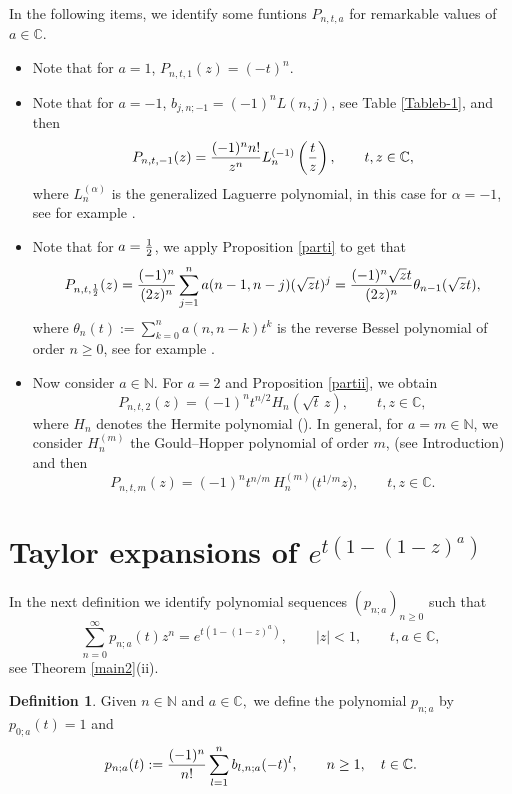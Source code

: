 \documentclass[a4paper,12pt]{amsart}
\def\N{\mathbb N}
\def\NN{\mathbb N}
\def\CC{\mathbb C}
\def\CC{\mathbb C}
\theoremstyle{definition}
\newtheorem{definition}[thm]{Definition}
\theoremstyle{remark}
\begin{document}
  In the following items, we  identify some funtions $P_{n,t,a}$ for remarkable values of $a\in \CC.$
\begin{itemize}
\item[(i)] Note that for $a=1$, $P_{n,t,1}(z)= (-t)^n$.
\item[(ii)] Note that for $a=-1$, $b_{j,n;-1}=(-1)^nL(n,j)$,  see Table \ref{Tableb-1}, and then
$$
P_{n,t,-1}(z)={(-1)^nn!\over z^n}L_n^{(-1)}\left({t\over z}\right),\qquad t,z\in \CC,
$$
where $L_n^{(\alpha)}$ is the generalized Laguerre polynomial, in this case for $\alpha=-1$, see for example \cite[Chapter V]{MOS}.

\item[(iii)]  Note that for $a={1\over 2}$, we apply Proposition \ref{parti} to get that
$$
P_{n,t,{1\over 2}}(z)={(-1)^n\over (2z)^n}\sum_{j=1}^na(n-1,n-j)(\sqrt{z}t)^j= {(-1)^n\sqrt{z}t\over (2z)^n}\theta_{n-1}(\sqrt{z}t),
$$
where  $\theta_{n}(t):=\displaystyle{\sum_{k=0}^n a(n,n-k)t^k}$ is the reverse Bessel polynomial of order $n\ge 0$, see for example \cite[p.7]{G}.


\item[(iv)]Now consider $a\in \N$. For  $a=2$ and Proposition \ref{partii},  we obtain
\begin{equation}\label{Hermite}
P_{n,t,2}(z)=(-1)^nt^{n/2}H_n(\sqrt{t}\,z),\qquad t,z\in \CC,
\end{equation}
where \(H_n\) denotes the Hermite polynomial (\cite[Chapter V]{MOS}). In general, for $a=m\in \N$, we consider \(H_n^{(m)}\)  the Gould--Hopper polynomial of order \(m\), (see Introduction) and
then
\[
P_{n,t,m}(z)
= (-1)^n t^{n/m}
\,H_n^{(m)}\!\bigl(t^{1/m}z\bigr), \qquad t,z\in \CC.
\]
\end{itemize}

\section{Taylor expansions of $e^{t(1-(1-z)^a)}$ }


In the next definition we identify   polynomial sequences $(p_{n;a})_{n\ge 0}$ such that
$$\sum_{n=0}^\infty p_{n;a}(t)z^n=e^{t(1-(1-z)^a)}, \qquad \vert  z\vert<1, \qquad t,a\in \CC,
$$
see Theorem \ref{main2}(ii).


\begin{definition}\label{pol} Given $n\in \NN$ and $a\in \CC,$ we define the polynomial $p_{n;a}$ by $p_{0;a}(t)=1$ and
$$
p_{n;a}(t):={(-1)^n\over n!}\sum_{l=1}^n b_{l,n;a}(-t)^l, \qquad n \ge 1,\quad t\in \CC.
$$


\end{definition}
\end{document}
